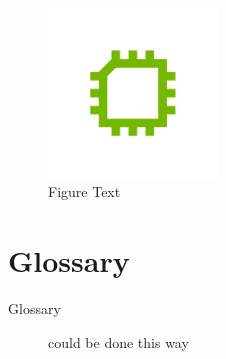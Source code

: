 \documentclass[openany]{scrreprt}
\begin{document}
\newpage
\begin{figure}[!h]
\centering
\includegraphics[width=0.4\textwidth]{./data/CE_Logo.png}
\caption{Figure Text}
\label{img:example-figure}
\end{figure}

\newpage

\chapter{Glossary}
\begin{description}
\item[Glossary] 
could be done this way
\end{description}
\end{document}
